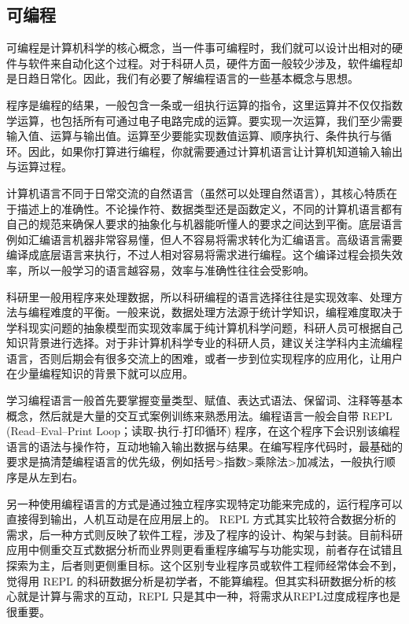 \documentclass[]{tufte-book}
\begin{document}
\hypertarget{ux53efux7f16ux7a0b}{%
\subsection{可编程}\label{ux53efux7f16ux7a0b}}

可编程是计算机科学的核心概念，当一件事可编程时，我们就可以设计出相对的硬件与软件来自动化这个过程。对于科研人员，硬件方面一般较少涉及，软件编程却是日趋日常化。因此，我们有必要了解编程语言的一些基本概念与思想。

程序是编程的结果，一般包含一条或一组执行运算的指令，这里运算并不仅仅指数学运算，也包括所有可通过电子电路完成的运算。要实现一次运算，我们至少需要输入值、运算与输出值。运算至少要能实现数值运算、顺序执行、条件执行与循环。因此，如果你打算进行编程，你就需要通过计算机语言让计算机知道输入输出与运算过程。

计算机语言不同于日常交流的自然语言（虽然可以处理自然语言），其核心特质在于描述上的准确性。不论操作符、数据类型还是函数定义，不同的计算机语言都有自己的规范来确保人要求的抽象化与机器能听懂人的要求之间达到平衡。底层语言例如汇编语言机器非常容易懂，但人不容易将需求转化为汇编语言。高级语言需要编译成底层语言来执行，不过人相对容易将需求进行编程。这个编译过程会损失效率，所以一般学习的语言越容易，效率与准确性往往会受影响。

科研里一般用程序来处理数据，所以科研编程的语言选择往往是实现效率、处理方法与编程难度的平衡。一般来说，数据处理方法源于统计学知识，编程难度取决于学科现实问题的抽象模型而实现效率属于纯计算机科学问题，科研人员可根据自己知识背景进行选择。对于非计算机科学专业的科研人员，建议关注学科内主流编程语言，否则后期会有很多交流上的困难，或者一步到位实现程序的应用化，让用户在少量编程知识的背景下就可以应用。

学习编程语言一般首先要掌握变量类型、赋值、表达式语法、保留词、注释等基本概念，然后就是大量的交互式案例训练来熟悉用法。编程语言一般会自带 REPL (Read--Eval--Print Loop；读取-执行-打印循环) 程序，在这个程序下会识别该编程语言的语法与操作符，互动地输入输出数据与结果。在编写程序代码时，最基础的要求是搞清楚编程语言的优先级，例如括号\textgreater{}指数\textgreater{}乘除法\textgreater{}加减法，一般执行顺序是从左到右。

另一种使用编程语言的方式是通过独立程序实现特定功能来完成的，运行程序可以直接得到输出，人机互动是在应用层上的。 REPL 方式其实比较符合数据分析的需求，后一种方式则反映了软件工程，涉及了程序的设计、构架与封装。目前科研应用中侧重交互式数据分析而业界则更看重程序编写与功能实现，前者存在试错且探索为主，后者则更侧重目标。这个区别专业程序员或软件工程师经常体会不到，觉得用 REPL 的科研数据分析是初学者，不能算编程。但其实科研数据分析的核心就是计算与需求的互动，REPL 只是其中一种，将需求从REPL过度成程序也是很重要。
\end{document}
